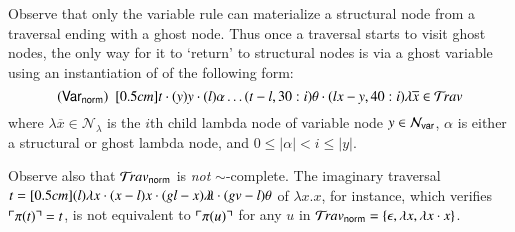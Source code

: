 \documentclass{elsarticle}
\theoremstyle{plain}
\theoremstyle{definition}
\theoremstyle{remark}
\newcommand\Nodes{\mathcal{N}}%
\newcommand\NodesVar{\Nodes_{\sf var}}%
\newcommand\NodesLmd{\Nodes_\lambda}%
\newcommand{\ghostlmd}{{\lambda\!\!\lambda}}
\newcommand{\ghostvar}{\theta}
\newcommand{\normalizing}{{\sf norm}}
\newcommand{\travsetnorm}{\travset_\normalizing}
\newcommand{\travulc}{\travset}
\def\coresymbol{\pi} %
\newcommand{\core}[1]{\coresymbol(#1)} %
\begin{document}
Observe that only the variable rule can materialize a structural node from a traversal ending with a ghost node. Thus once a traversal starts to visit ghost nodes, the only way for it to `return'  to structural nodes is via a ghost variable using an instantiation of \rulenamet{Var_\normalizing} of the following form:
$$\rulename{Var_\normalizing}\ \  \Pstr[0.5cm]{ t  \cdot
(y){y} \cdot (l){\alpha}  \ldots (t-l,30:i){\ghostvar}
    \cdot (lx-y,40:i){\lambda \overline{x}}
        \in\travulc}$$
where
 $\lambda \overline{x} \in \NodesLmd$ is the $i$th child lambda node of variable node $y \in \NodesVar$,
$\alpha$ is either a structural or ghost lambda node, and
 $0\leq |\alpha| < i \leq |y|$.

Observe also that $\travsetnorm$ is \emph{not} $\sim$-complete. The imaginary traversal
$t = \Pstr[0.5cm]{(l){\lambda x} \cdot (x-l){x} \cdot (gl-x){\ghostlmd} \cdot (gv-l){\ghostvar} }$ of  $\lambda x . x$,
for instance, which verifies $\pview{\core{t}} = t$, is not equivalent to $\pview{\core{u}}$ for any $u$ in $\travsetnorm = \{ \epsilon, \lambda x, \lambda x \cdot x \}$.
\end{document}
